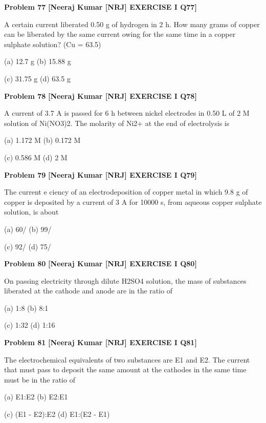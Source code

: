 \begin{problembox}
\textbf{Problem 77} \hfill \textbf{[Neeraj Kumar [NRJ] EXERCISE I Q77]}
\label{q:ext-nrj_all_questions-77}

A certain current liberated 0.50 g of hydrogen in 
2 h. How many grams of copper can be liberated 
by the same current   owing for the same time in a 
copper sulphate solution? (Cu = 63.5)
 
 (a) 12.7 g 
(b) 15.88 g
 
 (c) 31.75 g 
(d) 63.5 g
\end{problembox}

\begin{problembox}
\textbf{Problem 78} \hfill \textbf{[Neeraj Kumar [NRJ] EXERCISE I Q78]}
\label{q:ext-nrj_all_questions-78}

A current of 3.7 A is passed for 6 h between nickel 
electrodes in 0.50 L of 2 M solution of Ni(NO3)2. 
The molarity of Ni2+ at the end of electrolysis is
 
 (a) 1.172 M 
(b) 0.172 M
 
 (c) 0.586 M 
(d) 2 M
\end{problembox}

\begin{problembox}
\textbf{Problem 79} \hfill \textbf{[Neeraj Kumar [NRJ] EXERCISE I Q79]}
\label{q:ext-nrj_all_questions-79}

The current e   ciency of an electrodeposition of 
copper metal in which 9.8 g of copper is deposited 
by a current of 3  A for 10000 s, from aqueous 
copper sulphate solution, is about
 
 (a) 60/%
(b) 99/%
 
 (c) 92/%
(d) 75/%
\end{problembox}

\begin{problembox}
\textbf{Problem 80} \hfill \textbf{[Neeraj Kumar [NRJ] EXERCISE I Q80]}
\label{q:ext-nrj_all_questions-80}

On passing electricity through dilute H2SO4 
solution, the mass of substances liberated at the 
cathode and anode are in the ratio of
 
 (a) 1:8 
(b) 8:1
 
 (c) 1:32 
(d) 1:16
\end{problembox}

\begin{problembox}
\textbf{Problem 81} \hfill \textbf{[Neeraj Kumar [NRJ] EXERCISE I Q81]}
\label{q:ext-nrj_all_questions-81}

The electrochemical equivalents of two substances 
are E1 and E2. The current that must pass to 
deposit the same amount at the cathodes in the 
same time must be in the ratio of
 
 (a) E1:E2 
(b) E2:E1
 
 (c) (E1 - E2):E2 
(d) E1:(E2 - E1)
\end{problembox}

